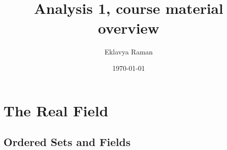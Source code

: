 \documentclass[openany]{book}
\begin{document}
\title{\Large{} \\ \vspace{5pt}
\large{Analysis 1, course material overview}}
\author{Eklavya Raman}
\date{\today}
\maketitle
\tableofcontents
\listoftheorems[
    show=mytheorem,
    title={List of Theorems}]
\listoffigures
\chapter{The Real Field}
\section{Ordered Sets and Fields}
\end{document}
